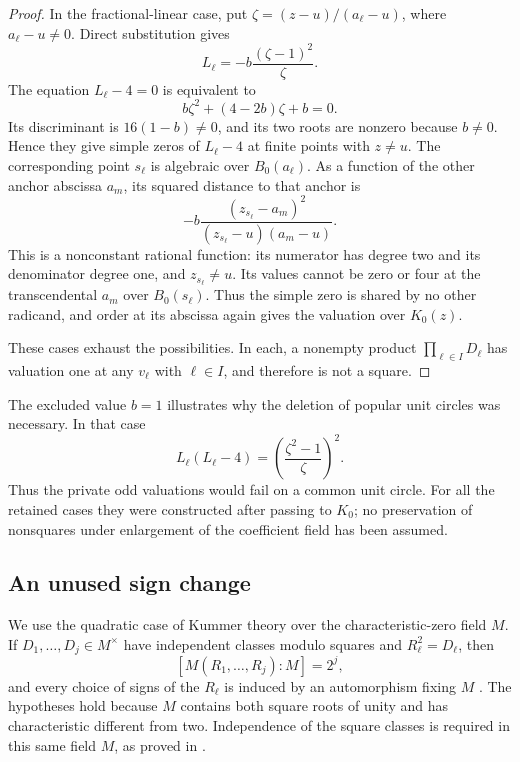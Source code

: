 \begin{proof}
In the fractional-linear case, put
\(\zeta=(z-u)/(a_\ell-u)\), where \(a_\ell-u\ne0\). Direct
substitution gives
\begin{equation}\label{alg:fractional-distance}
 L_\ell=-b\frac{(\zeta-1)^2}{\zeta}.
\end{equation}
The equation \(L_\ell-4=0\) is equivalent to
\[
 b\zeta^2+(4-2b)\zeta+b=0.
\]
Its discriminant is \(16(1-b)\ne0\), and its two roots are nonzero
because \(b\ne0\). Hence they give simple zeros of \(L_\ell-4\)
at finite points with \(z\ne u\). The corresponding point
\(s_\ell\) is algebraic over \(B_0(a_\ell)\). As a function of
the other anchor abscissa \(a_m\), its squared distance to that
anchor is
\[
 -b\frac{(z_{s_\ell}-a_m)^2}
          {(z_{s_\ell}-u)(a_m-u)}.
\]
This is a nonconstant rational function: its numerator has degree two
and its denominator degree one, and \(z_{s_\ell}\ne u\).
Its values cannot be zero or four at the transcendental
\(a_m\) over \(B_0(s_\ell)\). Thus the simple zero is shared by
no other radicand, and order at its abscissa again gives the
valuation over \(K_0(z)\).

These cases exhaust the possibilities. In each, a nonempty product
\(\prod_{\ell\in I}D_\ell\) has valuation one at any
\(v_\ell\) with \(\ell\in I\), and therefore is not a square.
\end{proof}

The excluded value \(b=1\) illustrates why the deletion of popular
unit circles was necessary. In that case
\[
 L_\ell(L_\ell-4)
   =\left(\frac{\zeta^2-1}{\zeta}\right)^2.
\]
Thus the private odd valuations would fail on a common unit circle.
For all the retained cases they were constructed after passing to
\(K_0\); no preservation of nonsquares under enlargement of the
coefficient field has been assumed.

\subsection{An unused sign change}

We use the quadratic case of Kummer theory over the characteristic-zero
field \(M\). If \(D_1,\ldots,D_j\in M^\times\) have independent
classes modulo squares and \(R_\ell^2=D_\ell\), then
\[
 [M(R_1,\ldots,R_j):M]=2^j,
\]
and every choice of signs of the \(R_\ell\) is induced by an
automorphism fixing \(M\)
\cite[Theorem~5.30 and Remark~5.32]{milneFields}.
The hypotheses hold because \(M\) contains both square roots of unity
and has characteristic different from two. Independence of the
square classes is required in this same field \(M\), as proved in
.

